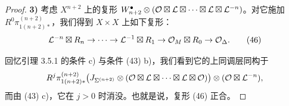 \begin{proof}
\textbf{3)} 考虑 $X^{n+2}$ 上的复形 $W^\bullet_{n+2}\otimes(\mathcal{O}\boxtimes\mathcal{L}\boxtimes\cdots\boxtimes\mathcal{L}\boxtimes\mathcal{L}^{-n})$。对它施加 $R^0\pi^{(n+2)}_{1(n+2)*}$，我们得到 $X\times X$ 上如下复形：
\begin{equation}
\mathcal{L}^{-n}\boxtimes R_n\to\cdots\to\mathcal{L}^{-1}\boxtimes R_1\to\mathcal{O}_M\boxtimes R_0\to\mathcal{O}_\Delta.\tag{46}
\end{equation}

回忆引理 3.5.1 的条件 c) 与条件 (43) b)，我们看到它的上同调层同构于
\begin{equation*}
R^j\pi^{(n+2)}_{1(n+2)*}\bigl(J_{\Sigma^{(n+2)}}\otimes(\mathcal{O}\boxtimes\mathcal{L}\boxtimes\cdots\boxtimes\mathcal{L}\boxtimes\mathcal{O})\bigr)\otimes(\mathcal{O}\boxtimes\mathcal{L}^{-n}),
\end{equation*}
而由 (43) c)，它在 $j>0$ 时消没。也就是说，复形 (46) 正合。
\end{proof}


